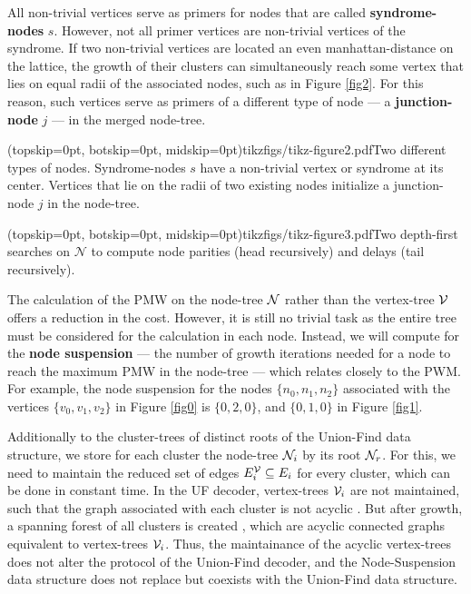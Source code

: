 All non-trivial vertices serve as primers for nodes that are called \textbf{syndrome-nodes} $s$. However, not all primer vertices are non-trivial vertices of the syndrome. If two non-trivial vertices are located an even manhattan-distance on the lattice, the growth of their clusters can simultaneously reach some vertex that lies on equal radii of the associated nodes, such as in Figure \ref{fig2}. For this reason, such vertices serve as primers of a different type of node --- a \textbf{junction-node} $j$ --- in the merged node-tree. 

\Figure[htb](topskip=0pt, botskip=0pt, midskip=0pt){tikzfigs/tikz-figure2.pdf}{Two different types of nodes. Syndrome-nodes $s$ have a non-trivial vertex or syndrome at its center. Vertices that lie on the radii of two existing nodes initialize a junction-node $j$ in the node-tree.\label{fig2}}

\Figure[hbt](topskip=0pt, botskip=0pt, midskip=0pt){tikzfigs/tikz-figure3.pdf}{Two depth-first searches on $\mathcal{N}$ to compute node parities (head recursively) and delays (tail recursively).\label{fig3}}

The calculation of the PMW on the node-tree $\mathcal{N}$ rather than the vertex-tree $\mathcal{V}$ offers a reduction in the cost. However, it is still no trivial task as the entire tree must be considered for the calculation in each node. Instead, we will compute for the \textbf{node suspension} --- the number of growth iterations needed for a node to reach the maximum PMW in the node-tree --- which relates closely to the PWM. For example, the node suspension for the nodes $\{n_0, n_1, n_2\}$ associated with the vertices $\{v_0, v_1, v_2\}$ in Figure \ref{fig0} is $\{0, 2, 0\}$, and $\{0, 1, 0\}$ in Figure \ref{fig1}.

Additionally to the cluster-trees of distinct roots of the Union-Find data structure, we store for each cluster the node-tree $\mathcal{N}_i$ by its root $\mathcal{N}_r$. For this, we need to maintain the reduced set of edges $E^{\mathcal{V}}_i \subseteq E_i$ for every cluster, which can be done in constant time. In the UF decoder, vertex-trees $\mathcal{V}_i$ are not maintained, such that the graph associated with each cluster is not acyclic \cite{delfosse2017almost}. But after growth, a spanning forest of all clusters is created \cite{delfosse2017linear}, which are acyclic connected graphs equivalent to vertex-trees $\mathcal{V}_i$. Thus, the maintainance of the acyclic vertex-trees does not alter the protocol of the Union-Find decoder, and the Node-Suspension data structure does not replace but coexists with the Union-Find data structure. 


